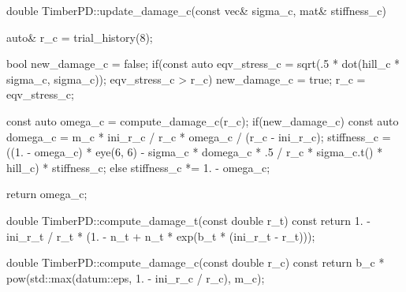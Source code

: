 \begin{cppcode}
double TimberPD::update_damage_c(const vec& sigma_c, mat& stiffness_c) {
    auto& r_c = trial_history(8);

    bool new_damage_c = false;
    if(const auto eqv_stress_c = sqrt(.5 * dot(hill_c * sigma_c, sigma_c)); eqv_stress_c > r_c) {
        new_damage_c = true;
        r_c = eqv_stress_c;
    }

    const auto omega_c = compute_damage_c(r_c);
    if(new_damage_c) {
        const auto domega_c = m_c * ini_r_c / r_c * omega_c / (r_c - ini_r_c);
        stiffness_c = ((1. - omega_c) * eye(6, 6) - sigma_c * domega_c * .5 / r_c * sigma_c.t() * hill_c) * stiffness_c;
    }
    else stiffness_c *= 1. - omega_c;

    return omega_c;
}

double TimberPD::compute_damage_t(const double r_t) const { return 1. - ini_r_t / r_t * (1. - n_t + n_t * exp(b_t * (ini_r_t - r_t))); }

double TimberPD::compute_damage_c(const double r_c) const { return b_c * pow(std::max(datum::eps, 1. - ini_r_c / r_c), m_c); }
\end{cppcode}